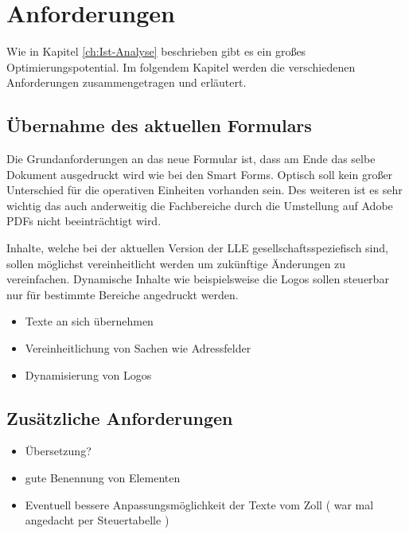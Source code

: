 \chapter{Anforderungen}
\label{ch:Anforderungen}

Wie in Kapitel \ref{ch:Ist-Analyse} beschrieben gibt es ein großes Optimierungspotential. Im folgendem Kapitel werden die verschiedenen Anforderungen zusammengetragen und erläutert.

\section{Übernahme des aktuellen Formulars}
	
	Die Grundanforderungen an das neue Formular ist, dass am Ende das selbe Dokument ausgedruckt wird wie bei den Smart Forms. Optisch soll kein großer Unterschied für die operativen Einheiten vorhanden sein. Des weiteren ist es sehr wichtig das auch anderweitig die Fachbereiche durch die Umstellung auf Adobe PDFs nicht beeinträchtigt wird.
	
	Inhalte, welche bei der aktuellen Version der \ac{LLE} gesellschaftsspeziefisch sind, sollen möglichst vereinheitlicht werden um zukünftige Änderungen zu vereinfachen. Dynamische Inhalte wie beispielsweise die Logos sollen steuerbar nur für bestimmte Bereiche angedruckt werden. 
	
\begin{itemize}
	
	\item Texte an sich übernehmen
	\item Vereinheitlichung von Sachen wie Adressfelder
	\item Dynamisierung von Logos
\end{itemize}


\section{Zusätzliche Anforderungen}
	
	\begin{itemize}
		\item Übersetzung?
		\item gute Benennung von Elementen
		\item Eventuell bessere Anpassungsmöglichkeit der Texte vom Zoll ( war mal angedacht per Steuertabelle )
		
		
		
	\end{itemize}

